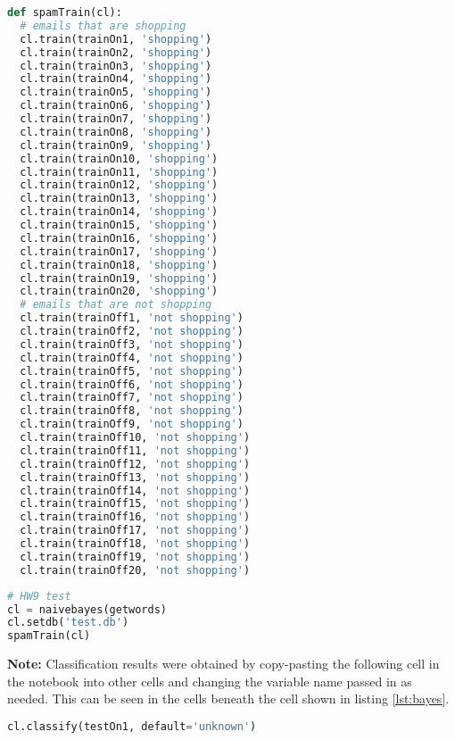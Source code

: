 \documentclass[12pt]{article}
\begin{document}
\begin{lstlisting}[language=Python, caption=Modified spamTrain function to train the classifier., label=lst:train]
def spamTrain(cl):
  # emails that are shopping
  cl.train(trainOn1, 'shopping')
  cl.train(trainOn2, 'shopping')
  cl.train(trainOn3, 'shopping')
  cl.train(trainOn4, 'shopping')
  cl.train(trainOn5, 'shopping')
  cl.train(trainOn6, 'shopping')
  cl.train(trainOn7, 'shopping')
  cl.train(trainOn8, 'shopping')
  cl.train(trainOn9, 'shopping')
  cl.train(trainOn10, 'shopping')
  cl.train(trainOn11, 'shopping')
  cl.train(trainOn12, 'shopping')
  cl.train(trainOn13, 'shopping')
  cl.train(trainOn14, 'shopping')
  cl.train(trainOn15, 'shopping')
  cl.train(trainOn16, 'shopping')
  cl.train(trainOn17, 'shopping')
  cl.train(trainOn18, 'shopping')
  cl.train(trainOn19, 'shopping')
  cl.train(trainOn20, 'shopping')
  # emails that are not shopping
  cl.train(trainOff1, 'not shopping')
  cl.train(trainOff2, 'not shopping')
  cl.train(trainOff3, 'not shopping')
  cl.train(trainOff4, 'not shopping')
  cl.train(trainOff5, 'not shopping')
  cl.train(trainOff6, 'not shopping')
  cl.train(trainOff7, 'not shopping')
  cl.train(trainOff8, 'not shopping')
  cl.train(trainOff9, 'not shopping')
  cl.train(trainOff10, 'not shopping')
  cl.train(trainOff11, 'not shopping')
  cl.train(trainOff12, 'not shopping')
  cl.train(trainOff13, 'not shopping')
  cl.train(trainOff14, 'not shopping')
  cl.train(trainOff15, 'not shopping')
  cl.train(trainOff16, 'not shopping')
  cl.train(trainOff17, 'not shopping')
  cl.train(trainOff18, 'not shopping')
  cl.train(trainOff19, 'not shopping')
  cl.train(trainOff20, 'not shopping') 
\end{lstlisting}

\begin{lstlisting}[language=Python, caption=Code cell to call the classifier set the database and call spamTrain, label=lst:bayes]
# HW9 test
cl = naivebayes(getwords)
cl.setdb('test.db')
spamTrain(cl)
\end{lstlisting}

\textbf{Note:} Classification results were obtained by copy-pasting the following cell in the notebook into other cells and changing the variable name passed in as needed.  This can be seen in the cells beneath the cell shown in listing \ref{lst:bayes}.
\begin{lstlisting}[language=Python, caption=Code to classify test variable., label=lst:classify]
cl.classify(testOn1, default='unknown')
\end{lstlisting}
\end{document}
